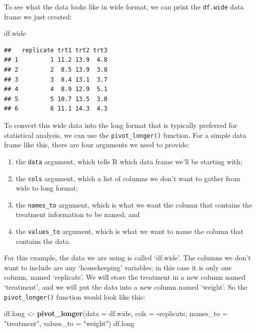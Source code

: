 \documentclass[letterpaper,]{book}
\newenvironment{Shaded}{\begin{snugshade}}{\end{snugshade}}
\newcommand{\DataTypeTok}[1]{\textcolor[rgb]{0.13,0.29,0.53}{#1}}
\newcommand{\KeywordTok}[1]{\textcolor[rgb]{0.13,0.29,0.53}{\textbf{#1}}}
\newcommand{\NormalTok}[1]{#1}
\newcommand{\OperatorTok}[1]{\textcolor[rgb]{0.81,0.36,0.00}{\textbf{#1}}}
\newcommand{\StringTok}[1]{\textcolor[rgb]{0.31,0.60,0.02}{#1}}
\providecommand{\tightlist}{%
  \setlength{\itemsep}{0pt}\setlength{\parskip}{0pt}}
\begin{document}
To see what the data looks like in wide format, we can print the \texttt{df.wide} data frame we just created:

\begin{Shaded}
\begin{Highlighting}[]
\NormalTok{df.wide}
\end{Highlighting}
\end{Shaded}

\begin{verbatim}
##   replicate trt1 trt2 trt3
## 1         1 11.2 13.9  4.8
## 2         2  8.5 13.9  3.8
## 3         3  8.4 13.1  3.7
## 4         4  8.9 12.9  5.1
## 5         5 10.7 13.5  3.0
## 6         6 11.1 14.3  4.3
\end{verbatim}

To convert this wide data into the long format that is typically preferred for statistical analysis, we can use the \texttt{pivot\_longer()} function. For a simple data frame like this, there are four arguments we need to provide:

\begin{enumerate}
\def\labelenumi{\arabic{enumi}.}
\tightlist
\item
  the \texttt{data} argument, which tells R which data frame we'll be starting with;
\item
  the \texttt{cols} argument, which a list of columns we don't want to gather from wide to long format;
\item
  the \texttt{names\_to} argument, which is what we want the column that contains the treatment information to be named; and
\item
  the \texttt{values\_to} argument, which is what we want to name the column that contains the data.
\end{enumerate}

For this example, the data we are using is called `df.wide'. The columns we don't want to include are any `housekeeping' variables; in this case it is only one column, named `replicate'. We will store the treatment in a new column named `treatment', and we will put the data into a new column named `weight'. So the \texttt{pivot\_longer()} function would look like this:

\begin{Shaded}
\begin{Highlighting}[]
\NormalTok{df.long <-}\StringTok{ }\KeywordTok{pivot_longer}\NormalTok{(}\DataTypeTok{data =}\NormalTok{ df.wide,}
                        \DataTypeTok{cols =} \OperatorTok{-}\NormalTok{replicate, }
                        \DataTypeTok{names_to =} \StringTok{"treatment"}\NormalTok{, }
                        \DataTypeTok{values_to =} \StringTok{"weight"}\NormalTok{)}
\NormalTok{df.long}
\end{Highlighting}
\end{Shaded}
\end{document}
